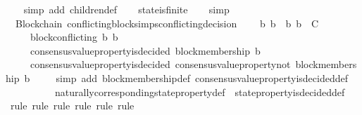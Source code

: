 \begin{isabellebody}
%
\isadelimproof
\ \ %
\endisadelimproof
%
\isatagproof
{}\isamarkupfalse%
\ {\isacharparenleft}simp\ add{\isacharcolon}\ children{\isacharunderscore}def{\isacharparenright}\isanewline
\ \ \isamarkupfalse%
\ state{\isacharunderscore}is{\isacharunderscore}finite\isanewline
\ \ \isamarkupfalse%
\ simp%
\endisatagproof
{\isafoldproof}%
%
\isadelimproof
\isanewline
%
\endisadelimproof
\ \ \ \isanewline
{}\isamarkupfalse%
\ {\isacharparenleft}\ Blockchain{\isacharparenright}\ conflicting{\isacharunderscore}blocks{\isacharunderscore}imps{\isacharunderscore}conflicting{\isacharunderscore}decision\ {\isacharcolon}\isanewline
\ \ {\isachardoublequoteopen}{\isasymforall}\ b{}\ b{}\ {\isasymsigma}{\isachardot}\ {\isacharbraceleft}b{}{\isacharcomma}\ b{}{\isacharbraceright}\ {\isasymsubseteq}\ C\ {\isasymand}\ {\isasymsigma}\ {\isasymin}\ {\isasymSigma}\ \isanewline
\ \ \ \ {\isasymlongrightarrow}\ block{\isacharunderscore}conflicting\ {\isacharparenleft}b{}{\isacharcomma}\ b{}{\isacharparenright}\ \isanewline
\ \ \ \ {\isasymlongrightarrow}\ consensus{\isacharunderscore}value{\isacharunderscore}property{\isacharunderscore}is{\isacharunderscore}decided\ {\isacharparenleft}block{\isacharunderscore}membership\ b{}{\isacharcomma}\ {\isasymsigma}{\isacharparenright}\ \isanewline
\ \ \ \ {\isasymlongrightarrow}\ consensus{\isacharunderscore}value{\isacharunderscore}property{\isacharunderscore}is{\isacharunderscore}decided\ {\isacharparenleft}consensus{\isacharunderscore}value{\isacharunderscore}property{\isacharunderscore}not\ {\isacharparenleft}block{\isacharunderscore}membership\ b{}{\isacharparenright}{\isacharcomma}\ {\isasymsigma}{\isacharparenright}{\isachardoublequoteclose}\isanewline
%
\isadelimproof
\ \ %
\endisadelimproof
%
\isatagproof
{}\isamarkupfalse%
\ {\isacharparenleft}simp\ add{\isacharcolon}\ block{\isacharunderscore}membership{\isacharunderscore}def\ consensus{\isacharunderscore}value{\isacharunderscore}property{\isacharunderscore}is{\isacharunderscore}decided{\isacharunderscore}def\isanewline
\ \ \ \ \ \ \ \ \ \ naturally{\isacharunderscore}corresponding{\isacharunderscore}state{\isacharunderscore}property{\isacharunderscore}def\ \ state{\isacharunderscore}property{\isacharunderscore}is{\isacharunderscore}decided{\isacharunderscore}def{\isacharparenright}\isanewline
\ \ \isamarkupfalse%
\ {\isacharparenleft}rule{\isacharcomma}\ rule{\isacharcomma}\ rule{\isacharcomma}\ rule{\isacharcomma}\ rule{\isacharcomma}\ rule{\isacharparenright}\ \isanewline

\end{isabellebody}
